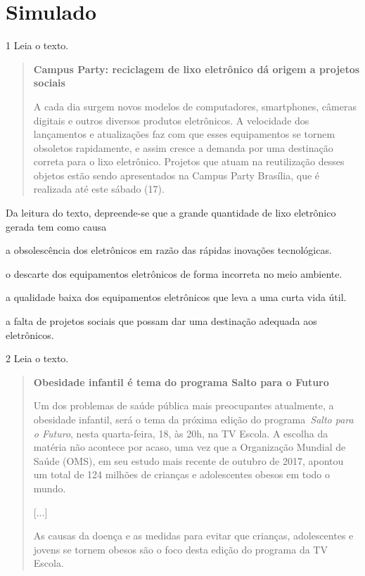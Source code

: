 \chapter[Simulado 4]{Simulado}

\num{1} Leia o texto.

\begin{quote}
\textbf{Campus Party: reciclagem de lixo eletrônico dá origem a projetos
sociais}

A cada dia surgem novos modelos de computadores, smartphones, câmeras
digitais e outros diversos produtos eletrônicos. A velocidade dos
lançamentos e atualizações faz com que esses equipamentos se tornem
obsoletos rapidamente, e assim cresce a demanda por uma destinação
correta para o lixo eletrônico. Projetos que atuam na reutilização
desses objetos estão sendo apresentados na Campus Party Brasília, que é
realizada até este sábado (17).

\end{quote}

Da leitura do texto, depreende-se que a grande quantidade de lixo
eletrônico gerada tem como causa

\begin{escolha}
\item a obsolescência dos eletrônicos em razão das rápidas inovações
tecnológicas.

\item o descarte dos equipamentos eletrônicos de forma incorreta no meio
ambiente.

\item a qualidade baixa dos equipamentos eletrônicos que leva a uma curta
vida útil.

\item a falta de projetos sociais que possam dar uma destinação adequada
aos eletrônicos.
\end{escolha}

\num{2} Leia o texto.

\begin{quote}
\textbf{Obesidade infantil é tema do programa Salto para o Futuro}

Um dos problemas de saúde pública mais preocupantes atualmente, a
obesidade infantil, será o tema da próxima edição do
programa~\emph{Salto para o Futuro}, nesta quarta-feira, 18, às 20h, na
TV Escola. A escolha da matéria não acontece por acaso, uma vez que a
Organização Mundial de Saúde (OMS), em seu estudo mais recente de
outubro de 2017, apontou um total de 124 milhões de crianças e
adolescentes obesos em todo o mundo.

{[}...{]}

As causas da doença e as medidas para evitar que crianças, adolescentes
e jovens se tornem obesos são o foco desta edição do programa da TV
Escola.

\end{quote}

